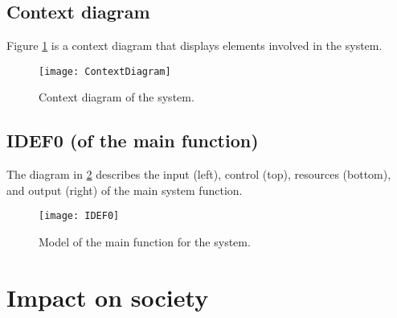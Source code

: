 \documentclass[%
oneside,    %
project,    %
nosummary   %
]{USN-MSc}
\begin{document}
\section{Context diagram}
\label{sec:contextDiagram}

Figure \ref{fig:contextDiagram} is a context diagram that displays elements involved in the system.

\begin{figure}[!ht]
  \centering
 \texttt{[image: ContextDiagram]}
 \caption{Context diagram of the system.}
 \label{fig:contextDiagram}
\end{figure}

\section{IDEF0 (of the main function)}
\label{sec:IDEF0}

The diagram in \ref{fig:idef0} describes the input (left), control (top), resources (bottom), and output (right) of the main system function.

\begin{figure}[!ht]
  \centering
 \texttt{[image: IDEF0]}
 \caption{Model of the main function for the system.}
 \label{fig:idef0}
\end{figure}

\chapter{Impact on society}
\label{ch:impact}
\end{document}
